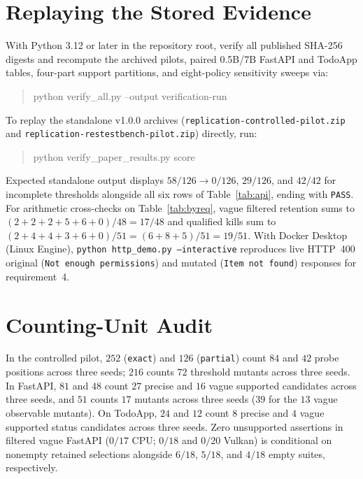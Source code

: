 \documentclass[sigconf,nonacm]{acmart}
\begin{document}
\appendix
\section{Replaying the Stored Evidence}
\label{app:replay}
With Python 3.12 or later in the repository root, verify all published SHA-256 digests and recompute the archived pilots, paired 0.5B/7B FastAPI and TodoApp tables, four-part support partitions, and eight-policy sensitivity sweeps via:
\begin{quote}\small\ttfamily
python verify\_all.py --output verification-run
\end{quote}
To replay the standalone v1.0.0 archives (\nolinkurl{replication-controlled-pilot.zip} and \nolinkurl{replication-restestbench-pilot.zip}) directly, run:
\begin{quote}\small\ttfamily
python verify\_paper\_results.py score
\end{quote}
Expected standalone output displays $58/126\to 0/126$, $29/126$, and $42/42$ for incomplete thresholds alongside all six rows of Table~\ref{tab:api}, ending with \texttt{PASS}. For arithmetic cross-checks on Table~\ref{tab:byreq}, vague filtered retention sums to $(2+2+2+5+6+0)/48=17/48$ and qualified kills sum to $(2+4+4+3+6+0)/51=(6+8+5)/51=19/51$. With Docker Desktop (Linux Engine), \texttt{python http\_demo.py --interactive} reproduces live HTTP~400 original (\texttt{Not enough permissions}) and mutated (\texttt{Item not found}) responses for requirement~4.

\section{Counting-Unit Audit}
In the controlled pilot, $252$ (\texttt{exact}) and $126$ (\texttt{partial}) count $84$ and $42$ probe positions across three seeds; $216$ counts $72$ threshold mutants across three seeds. In FastAPI, $81$ and $48$ count $27$ precise and $16$ vague supported candidates across three seeds, and $51$ counts $17$ mutants across three seeds ($39$ for the $13$ vague observable mutants). On TodoApp, $24$ and $12$ count $8$ precise and $4$ vague supported status candidates across three seeds. Zero unsupported assertions in filtered vague FastAPI ($0/17$ CPU; $0/18$ and $0/20$ Vulkan) is conditional on nonempty retained selections alongside $6/18$, $5/18$, and $4/18$ empty suites, respectively.
\end{document}
